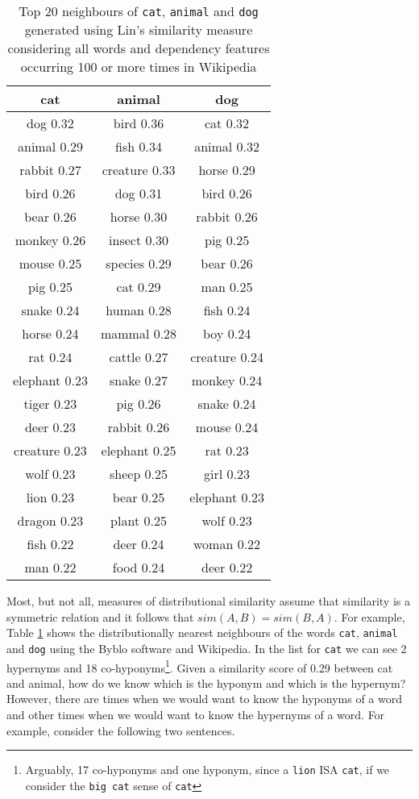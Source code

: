 \documentclass[11pt]{article}
\begin{document}
\begin{table}[ht]
\begin{tabular}{|c|c|c|}
\hline
cat&animal&dog\\
\hline
dog 0.32&bird 0.36&cat 0.32\\
animal 0.29&fish 0.34&animal 0.32\\
rabbit 0.27&creature 0.33&horse 0.29\\
bird 0.26&dog 0.31&bird 0.26\\
bear 0.26&horse 0.30&rabbit 0.26\\
monkey 0.26&insect 0.30&pig 0.25\\
mouse 0.25&species 0.29&bear 0.26\\
pig 0.25&cat 0.29&man 0.25\\
snake 0.24&human 0.28&fish 0.24\\
horse 0.24&mammal 0.28&boy 0.24\\
rat 0.24&cattle 0.27&creature 0.24\\
elephant 0.23&snake 0.27&monkey 0.24\\
tiger 0.23&pig 0.26&snake 0.24\\
deer 0.23&rabbit 0.26&mouse 0.24\\
creature 0.23&elephant 0.25&rat 0.23\\
wolf 0.23&sheep 0.25&girl 0.23\\
lion 0.23&bear 0.25&elephant 0.23\\
dragon 0.23&plant 0.25&wolf 0.23\\
fish 0.22&deer 0.24&woman 0.22\\
man 0.22&food 0.24&deer 0.22\\
\hline
\end{tabular}
\label{table:neighbours}
\caption{Top 20 neighbours of \texttt{cat}, \texttt{animal} and \texttt{dog} generated using Lin's similarity measure \cite{Lin1998} considering all words and dependency features occurring 100 or more times in Wikipedia}
\end{table}
Most, but not all, measures of distributional similarity assume that similarity is a symmetric relation and it follows that $sim(A,B) = sim(B,A)$.  For example, Table \ref{table:neighbours} shows the distributionally nearest neighbours of the words \texttt{cat}, \texttt{animal} and \texttt{dog} using the Byblo software and Wikipedia.  In the list for \texttt{cat} we can see 2 hypernyms and 18 co-hyponyms\footnote{Arguably, 17 co-hyponyms and one hyponym, since a \texttt{lion} ISA \texttt{cat}, if we consider the \texttt{big cat} sense of \texttt{cat}}.  Given a similarity score of 0.29 between cat and animal, how do we know which is the hyponym and which is the hypernym? However, there are times when we would want to know the hyponyms of a word and other times when we would want to know the hypernyms of a word.  For example, consider the following two sentences.
\end{document}
